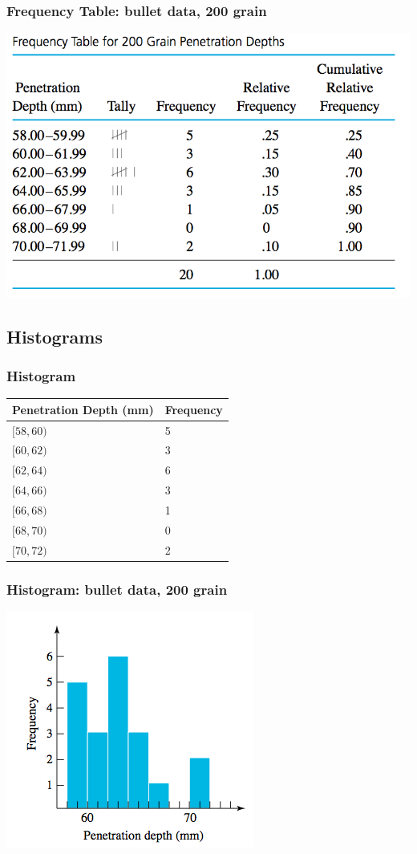 \documentclass[handout]{beamer}
\numberwithin{equation}{section}
\begin{document}
\begin{frame}
\frametitle{Frequency Table: bullet data, 200 grain}
\begin{center}
 \includegraphics{../../fig/bulletsfreq.png}
\end{center}
\end{frame}

\subsection{Histograms}
\begin{frame}[plain]
\frametitle{Histogram}
\scriptsize
\begin{tabular}{p{5em}l}
\hline
Penetration Depth (mm) & Frequency\\ \hline
$[58, 60)$ & 5\\
$[60, 62)$ & 3\\
$[62, 64)$ & 6\\
$[64, 66)$ & 3\\
$[66, 68)$ & 1\\
$[68, 70)$ & 0\\
$[70, 72)$ & 2 \\ \hline
\end{tabular}
\end{frame}


\begin{frame}
\frametitle{Histogram: bullet data, 200 grain}
\begin{center}
 \includegraphics{../../fig/bullethist.png}
\end{center}
\end{frame}
\end{document}

